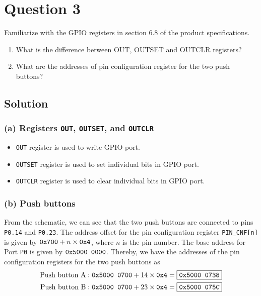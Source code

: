\section*{Question 3}

Familiarize with the GPIO registers in section 6.8 of the product specifications.
\begin{enumerate}[label= (\alph*)]
    \item What is the diﬀerence between OUT, OUTSET and OUTCLR registers?
    \item What are the addresses of pin configuration register for the two push buttons?
\end{enumerate}

\subsection*{Solution}

\subsubsection*{(a) Registers \texttt{OUT}, \texttt{OUTSET}, and \texttt{OUTCLR}}

\begin{itemize}
    \item \texttt{OUT} register is used to write GPIO port.
    \item \texttt{OUTSET} register is used to set individual bits in GPIO port.
    \item \texttt{OUTCLR} register is used to clear individual bits in GPIO port.
\end{itemize}

\subsubsection*{(b) Push buttons}

From the schematic, we can see that the two push buttons are connected to pins \texttt{P0.14} and \texttt{P0.23}.
The address offset for the pin configuration register \texttt{PIN\_CNF[n]} is given by \( \texttt{0x700} + n \times \texttt{0x4} \), where \( n \) is the pin number.
The base address for Port \texttt{P0} is given by \( \texttt{0x5000 0000} \).
Thereby, we have the addresses of the pin configuration registers for the two push buttons as
\begin{align*}
    \text{Push button A} & : \texttt{0x5000 0700} + 14 \times \texttt{0x4} = \boxed{\texttt{0x5000 0738}} \\
    \text{Push button B} & : \texttt{0x5000 0700} + 23 \times \texttt{0x4} = \boxed{\texttt{0x5000 075C}}
\end{align*}
